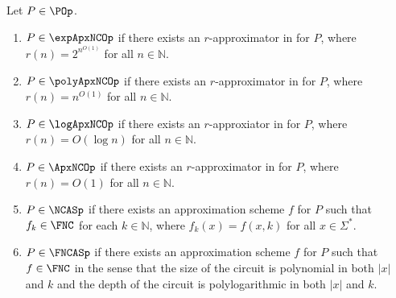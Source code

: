 \documentclass[]{article}
\begin{document}
\begin{definition}\label{def:ncxprime}
  Let $P\in\POp$.
  \begin{enumerate}
  \item $P\in\expApxNCOp$ if there exists an $r$-approximator in \FNC{} for $P$, where $r(n)=2^{n^{O(1)}}$ for all $n\in\mathbb{N}$.
  \item $P\in\polyApxNCOp$ if there exists an $r$-approximator in \FNC{} for $P$, where $r(n)=n^{O(1)}$ for all $n\in\mathbb{N}$.
  \item $P\in\logApxNCOp$ if there exists an $r$-approxiator in \FNC{} for $P$, where $r(n)=O(\log n)$ for all $n\in\mathbb{N}$.
  \item $P\in\ApxNCOp$ if there exists an $r$-approximator in \FNC{} for $P$, where $r(n)=O(1)$ for all $n\in\mathbb{N}$.
  \item $P\in\NCASp$ if there exists an approximation scheme $f$ for $P$ such that $f_k\in\FNC$ for each $k\in\mathbb{N}$, where $f_k(x)=f(x, k)$ for all $x\in\Sigma^*$.
  \item $P\in\FNCASp$ if there exists an approximation scheme $f$ for $P$ such that $f\in\FNC$ in the sense that the size of the circuit is polynomial in both $|x|$ and $k$ and the depth of the circuit is polylogarithmic in both $|x|$ and $k$.
  \end{enumerate}
\end{definition}
\end{document}
